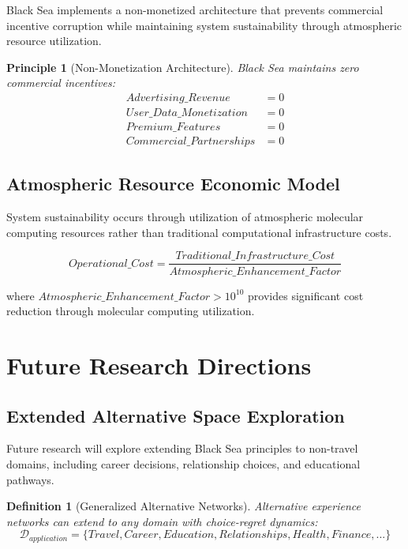 \documentclass[12pt,a4paper]{article}
\newtheorem{definition}{Definition}
\newtheorem{principle}{Principle}
\begin{document}
Black Sea implements a non-monetized architecture that prevents commercial incentive corruption while maintaining system sustainability through atmospheric resource utilization.

\begin{principle}[Non-Monetization Architecture]
Black Sea maintains zero commercial incentives:
\begin{align}
Advertising\_Revenue &= 0 \\
User\_Data\_Monetization &= 0 \\
Premium\_Features &= 0 \\
Commercial\_Partnerships &= 0
\end{align}
\end{principle}

\subsection{Atmospheric Resource Economic Model}

System sustainability occurs through utilization of atmospheric molecular computing resources rather than traditional computational infrastructure costs.

\begin{equation}
Operational\_Cost = \frac{Traditional\_Infrastructure\_Cost}{Atmospheric\_Enhancement\_Factor}
\end{equation}

where $Atmospheric\_Enhancement\_Factor > 10^{10}$ provides significant cost reduction through molecular computing utilization.

\section{Future Research Directions}

\subsection{Extended Alternative Space Exploration}

Future research will explore extending Black Sea principles to non-travel domains, including career decisions, relationship choices, and educational pathways.

\begin{definition}[Generalized Alternative Networks]
Alternative experience networks can extend to any domain with choice-regret dynamics:
\begin{equation}
\mathcal{D}_{application} = \{Travel, Career, Education, Relationships, Health, Finance, ...\}
\end{equation}
\end{definition}
\end{document}
